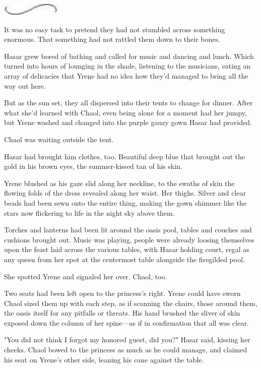 \begin{center}
	\includegraphics[width=1.12in,height=0.24in]{images/seperator}
\end{center}

It was no easy task to pretend they had not stumbled across something enormous.
That something had not rattled them down to their bones.

Hasar grew bored of bathing and called for music and dancing and lunch.
Which turned into hours of lounging in the shade, listening to the musicians, eating an array of delicacies that Yrene had no idea how they'd managed to bring all the way out here.

But as the sun set, they all dispersed into their tents to change for dinner.
After what she'd learned with Chaol, even being alone for a moment had her jumpy, but Yrene washed and changed into the purple gauzy gown Hasar had provided.

Chaol was waiting outside the tent.

Hasar had brought him clothes, too.
Beautiful deep blue that brought out the gold in his brown eyes, the summer-kissed tan of his skin.

Yrene blushed as his gaze slid along her neckline, to the swaths of skin the flowing folds of the dress revealed along her waist.
Her thighs.
Silver and clear beads had been sewn onto the entire thing, making the gown shimmer like the stars now flickering to life in the night sky above them.

Torches and lanterns had been lit around the oasis pool, tables and couches and cushions brought out.
Music was playing, people were already loosing themselves upon the feast laid across the various tables, with Hasar holding court, regal as any queen from her spot at the centermost table alongside the firegilded pool.

She spotted Yrene and signaled her over.
Chaol, too.

Two seats had been left open to the princess's right.
Yrene could have sworn Chaol sized them up with each step, as if scanning the chairs, those around them, the oasis itself for any pitfalls or threats.
His hand brushed the sliver of skin exposed down the column of her spine---as if in confirmation that all was clear.

"You did not think I forgot my honored guest, did you?"
Hasar said, kissing her cheeks.
Chaol bowed to the princess as much as he could manage, and claimed his seat on Yrene's other side, leaning his cane against the table.


